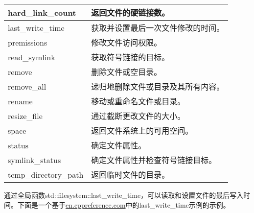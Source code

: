 \begin{longtable}[c]{|l|l|}
hard\_link\_count                             & 返回文件的硬链接数。                     \\ \hline
last\_write\_time                             & 获取并设置最后一次文件修改的时间。           \\ \hline
premissions                                   & 修改文件访问权限。                           \\ \hline
read\_symlink                                 & 获取符号链接的目标。                           \\ \hline
remove                                        & 删除文件或空目录。                           \\ \hline
remove\_all                                   & 递归地删除文件或目录及其所有内容。 \\ \hline
rename                                        & 移动或重命名文件或目录。                           \\ \hline
resize\_file                                  & 通过截断更改文件的大小。                       \\ \hline
space                                         & 返回文件系统上的可用空间。                       \\ \hline
status                                        & 确定文件属性。                                 \\ \hline
symlink\_status                               & 确定文件属性并检查符号链接目标。  \\ \hline
temp\_directory\_path                         & 返回临时文件的目录。                        \\ \hline
\end{longtable}


通过全局函数std::filesystem::last\_write\_time，可以读取和设置文件的最后写入时间。下面是一个基于\href{http://en.cppreference.com/w/cpp/experimental/fs/last_write_time}{en.cppreference.com}中的last\_write\_time示例的示例。


